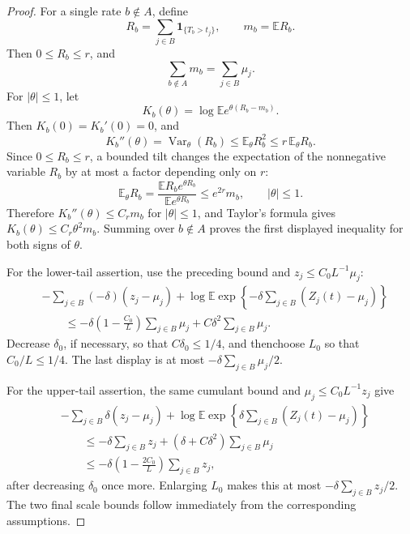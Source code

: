 \documentclass[11pt]{article}
\theoremstyle{remark}
\newcommand{\Ee}{\mathbb E}
\newcommand{\one}{\mathbf 1}
\newcommand{\Var}{\operatorname{Var}}
\begin{document}
\begin{proof}
For a single rate \(b\notin A\), define
\[
        R_b=\sum_{j\in B}\one_{\{T_b>t_j\}},
        \qquad m_b=\Ee R_b .
\]
Then \(0\le R_b\le r\), and
\[
        \sum_{b\notin A}m_b=\sum_{j\in B}\mu_j .
\]
For \(|\theta|\le1\), let
\[
        K_b(\theta)=\log \Ee e^{\theta(R_b-m_b)} .
\]
Then \(K_b(0)=K_b'(0)=0\), and
\[
        K_b''(\theta)=\Var_\theta(R_b)
        \le \Ee_\theta R_b^2
        \le r\,\Ee_\theta R_b .
\]
Since \(0\le R_b\le r\), a bounded tilt changes the expectation of the
nonnegative variable \(R_b\) by at most a factor depending only on \(r\):
\[
        \Ee_\theta R_b
        =\frac{\Ee R_be^{\theta R_b}}{\Ee e^{\theta R_b}}
        \le e^{2r}m_b,
        \qquad |\theta|\le1 .
\]
Therefore \(K_b''(\theta)\le C_rm_b\) for \(|\theta|\le1\), and Taylor's
formula gives \(K_b(\theta)\le C_r\theta^2m_b\).  Summing over
\(b\notin A\) proves the first displayed inequality for both signs of
\(\theta\).

For the lower-tail assertion, use the preceding bound and
\(z_j\le C_0L^{-1}\mu_j\):
\[
\begin{aligned}
&-\sum_{j\in B}(-\delta)(z_j-\mu_j)
 +\log \Ee\exp\left\{-\delta\sum_{j\in B}(Z_j(t)-\mu_j)\right\} \\
&\qquad\le
        -\delta\left(1-\frac{C_0}{L}\right)\sum_{j\in B}\mu_j
        +C\delta^2\sum_{j\in B}\mu_j .
\end{aligned}
\]
Decrease \(\delta_0\), if necessary, so that \(C\delta_0\le1/4\), and thenchoose \(L_0\) so that \(C_0/L\le1/4\).  The last display is at most
\(-\delta\sum_{j\in B}\mu_j/2\).

For the upper-tail assertion, the same cumulant bound and
\(\mu_j\le C_0L^{-1}z_j\) give
\[
\begin{aligned}
&-\sum_{j\in B}\delta(z_j-\mu_j)
 +\log \Ee\exp\left\{\delta\sum_{j\in B}(Z_j(t)-\mu_j)\right\} \\
&\qquad\le
        -\delta\sum_{j\in B}z_j
        +(\delta+C\delta^2)\sum_{j\in B}\mu_j\\
&\qquad\le
        -\delta\left(1-\frac{2C_0}{L}\right)
        \sum_{j\in B}z_j,
\end{aligned}
\]
after decreasing \(\delta_0\) once more.  Enlarging \(L_0\) makes this at
most \(-\delta\sum_{j\in B}z_j/2\).  The two final scale bounds follow
immediately from the corresponding assumptions.
\end{proof}
\end{document}
